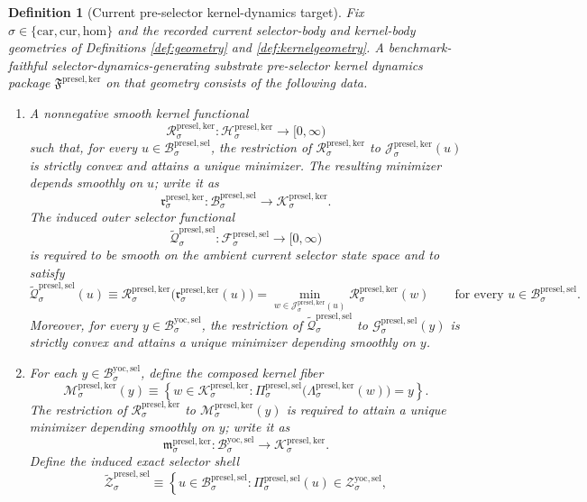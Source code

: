 \documentclass[11pt]{article}
\newcommand{\Car}{\mathrm{car}}
\newcommand{\Cur}{\mathrm{cur}}
\newcommand{\Hom}{\mathrm{hom}}
\newcommand{\YoctoSelectorBody}[1]{\mathcal B_{#1}^{\mathrm{yoc,sel}}}
\newcommand{\YoctoSelectorShell}[1]{\mathcal Z_{#1}^{\mathrm{yoc,sel}}}
\newcommand{\PreSectionSelectorSpace}[1]{\mathcal F_{#1}^{\mathrm{presel,sel}}}
\newcommand{\PreSectionSelectorBody}[1]{\mathcal B_{#1}^{\mathrm{presel,sel}}}
\newcommand{\PreSectionSelectorProj}[1]{\Pi_{#1}^{\mathrm{presel,sel}}}
\newcommand{\PreSectionSelectorFiber}[2]{\mathcal G_{#1}^{\mathrm{presel,sel}}(#2)}
\newcommand{\KernelPackage}{\mathfrak F^{\mathrm{presel,ker}}}
\newcommand{\KernelSpace}[1]{\mathcal H_{#1}^{\mathrm{presel,ker}}}
\newcommand{\KernelBody}[1]{\mathcal K_{#1}^{\mathrm{presel,ker}}}
\newcommand{\KernelProj}[1]{\Lambda_{#1}^{\mathrm{presel,ker}}}
\newcommand{\KernelFiber}[2]{\mathcal J_{#1}^{\mathrm{presel,ker}}(#2)}
\newcommand{\KernelFunctional}[1]{\mathscr R_{#1}^{\mathrm{presel,ker}}}
\newcommand{\KernelMinLift}[1]{\mathfrak r_{#1}^{\mathrm{presel,ker}}}
\newcommand{\KernelComposedFiber}[2]{\mathcal M_{#1}^{\mathrm{presel,ker}}(#2)}
\newcommand{\KernelComposedMin}[1]{\mathfrak m_{#1}^{\mathrm{presel,ker}}}
\newcommand{\InducedSelectorFunctional}[1]{\widetilde{\mathscr Q}_{#1}^{\mathrm{presel,sel}}}
\newcommand{\InducedSelectorShell}[1]{\widetilde{\mathcal Z}_{#1}^{\mathrm{presel,sel}}}
\newtheorem{definition}{Definition}
\begin{document}
\begin{definition}[Current pre-selector kernel-dynamics target]
\label{def:kernel}
Fix \(\sigma\in\{\Car,\Cur,\Hom\}\) and the recorded current selector-body and kernel-body geometries of Definitions \ref{def:geometry} and \ref{def:kernelgeometry}. A \emph{benchmark-faithful selector-dynamics-generating substrate pre-selector kernel dynamics package} \(\KernelPackage\) on that geometry consists of the following data.
\begin{enumerate}
    \item A nonnegative smooth kernel functional
    \[
    \KernelFunctional{\sigma}:\KernelSpace{\sigma}\to[0,\infty)
    \]
    such that, for every \(u\in\PreSectionSelectorBody{\sigma}\), the restriction of \(\KernelFunctional{\sigma}\) to \(\KernelFiber{\sigma}{u}\) is strictly convex and attains a unique minimizer. The resulting minimizer depends smoothly on \(u\); write it as
    \[
    \KernelMinLift{\sigma}:\PreSectionSelectorBody{\sigma}\to\KernelBody{\sigma}.
    \]
    The induced outer selector functional
    \[
    \InducedSelectorFunctional{\sigma}:\PreSectionSelectorSpace{\sigma}\to[0,\infty)
    \]
    is required to be smooth on the ambient current selector state space and to satisfy
    \[
    \InducedSelectorFunctional{\sigma}(u)
    \equiv
    \KernelFunctional{\sigma}\bigl(\KernelMinLift{\sigma}(u)\bigr)
    =
    \min_{w\in\KernelFiber{\sigma}{u}}
    \KernelFunctional{\sigma}(w)
    \qquad
    \text{for every }
    u\in\PreSectionSelectorBody{\sigma}.
    \]
    Moreover, for every \(y\in\YoctoSelectorBody{\sigma}\), the restriction of \(\InducedSelectorFunctional{\sigma}\) to \(\PreSectionSelectorFiber{\sigma}{y}\) is strictly convex and attains a unique minimizer depending smoothly on \(y\).
    \item For each \(y\in\YoctoSelectorBody{\sigma}\), define the composed kernel fiber
    \[
    \KernelComposedFiber{\sigma}{y}
    \equiv
    \left\{
    w\in\KernelBody{\sigma}:
    \PreSectionSelectorProj{\sigma}\bigl(\KernelProj{\sigma}(w)\bigr)=y
    \right\}.
    \]
    The restriction of \(\KernelFunctional{\sigma}\) to \(\KernelComposedFiber{\sigma}{y}\) is required to attain a unique minimizer depending smoothly on \(y\); write it as
    \[
    \KernelComposedMin{\sigma}:\YoctoSelectorBody{\sigma}\to\KernelBody{\sigma}.
    \]
    Define the induced exact selector shell
    \[
    \InducedSelectorShell{\sigma}
    \equiv
    \left\{
    u\in\PreSectionSelectorBody{\sigma}:
    \PreSectionSelectorProj{\sigma}(u)\in\YoctoSelectorShell{\sigma},
\]
\end{enumerate}
\end{definition}
\end{document}
